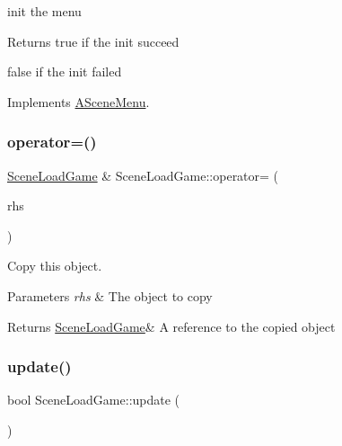 init the menu 

\begin{DoxyReturn}{Returns}
true if the init succeed 

false if the init failed 
\end{DoxyReturn}


Implements \hyperlink{class_a_scene_menu_a78bdee98bd7df224524586a060f9bdec}{A\+Scene\+Menu}.

\mbox{\label{class_scene_load_game_a4490f6bcd13404d4960110e06765e9b9}} 
\subsubsection{\texorpdfstring{operator=()}{operator=()}}
{\footnotesize\ttfamily \hyperlink{class_scene_load_game}{Scene\+Load\+Game} \& Scene\+Load\+Game\+::operator= (\begin{DoxyParamCaption}\item[{\hyperlink{class_scene_load_game}{Scene\+Load\+Game} const \&}]{rhs }\end{DoxyParamCaption})}



Copy this object. 


\begin{DoxyParams}{Parameters}
{\em rhs} & The object to copy \\
\hline
\end{DoxyParams}
\begin{DoxyReturn}{Returns}
\hyperlink{class_scene_load_game}{Scene\+Load\+Game}\& A reference to the copied object 
\end{DoxyReturn}
\mbox{\label{class_scene_load_game_ad33de3b5d98596754f058a4e096ba1b3}} 
\subsubsection{\texorpdfstring{update()}{update()}}
{\footnotesize\ttfamily bool Scene\+Load\+Game\+::update (\begin{DoxyParamCaption}{ }\end{DoxyParamCaption})\hspace{0.3cm}{\ttfamily [virtual]}}



